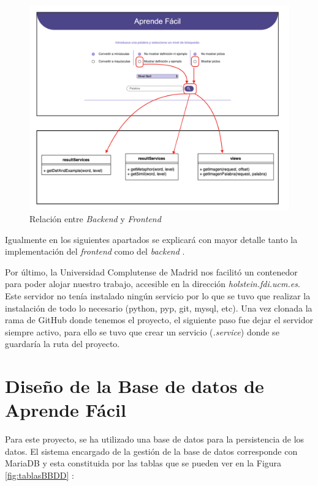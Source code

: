 \begin{figure}[!h]
	\includegraphics[width=1.2\textwidth]{Imagenes/Bitmap/Capitulo4/RelacionBackFront.png}
	\caption{Relación entre \textit{Backend} y \textit{Frontend}}
	\label{fig:relacionBackFront}
\end{figure}


 Igualmente en los siguientes apartados se explicará con mayor detalle tanto la implementación del \textit{frontend} como del \textit{backend} . 

Por último, la Universidad Complutense de Madrid nos facilitó un contenedor para poder alojar nuestro trabajo, accesible en la dirección \textit{holstein.fdi.ucm.es}. Este servidor no tenía instalado ningún servicio por lo que se tuvo que realizar la instalación de todo lo necesario (python, pyp, git, mysql, etc). Una vez clonada la rama de GitHub donde tenemos el proyecto, el siguiente paso fue dejar el servidor siempre activo, para ello se tuvo que crear un servicio (\textit{.service}) donde se guardaría la ruta del proyecto.

\section{Diseño de la Base de datos de Aprende Fácil}

Para este proyecto, se ha utilizado una base de datos para la persistencia de los datos. El sistema encargado de la gestión de la base de datos corresponde con MariaDB y esta constituida por las tablas que se pueden ver en la Figura \ref{fig:tablasBBDD} :


